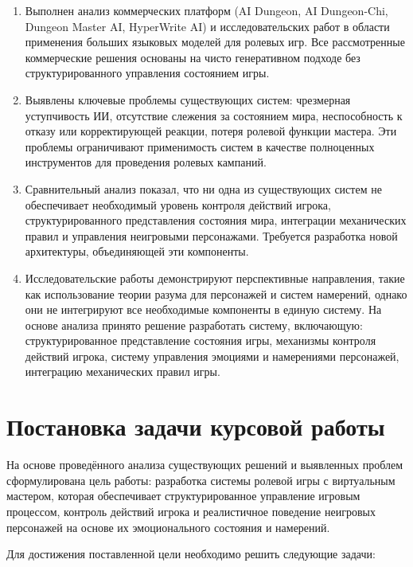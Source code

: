 \begin{enumerate}
	\item Выполнен анализ коммерческих платформ (AI Dungeon, AI Dungeon-Chi, Dungeon Master AI, HyperWrite AI) и исследовательских работ в области применения больших языковых моделей для ролевых игр. Все рассмотренные коммерческие решения основаны на чисто генеративном подходе без структурированного управления состоянием игры.
	
	\item Выявлены ключевые проблемы существующих систем: чрезмерная уступчивость ИИ, отсутствие слежения за состоянием мира, неспособность к отказу или корректирующей реакции, потеря ролевой функции мастера. Эти проблемы ограничивают применимость систем в качестве полноценных инструментов для проведения ролевых кампаний.
	
	\item Сравнительный анализ показал, что ни одна из существующих систем не обеспечивает необходимый уровень контроля действий игрока, структурированного представления состояния мира, интеграции механических правил и управления неигровыми персонажами. Требуется разработка новой архитектуры, объединяющей эти компоненты.
	
	\item Исследовательские работы демонстрируют перспективные направления, такие как использование теории разума для персонажей и систем намерений, однако они не интегрируют все необходимые компоненты в единую систему. На основе анализа принято решение разработать систему, включающую: структурированное представление состояния игры, механизмы контроля действий игрока, систему управления эмоциями и намерениями персонажей, интеграцию механических правил игры.
\end{enumerate}



\section{Постановка задачи курсовой работы}

На основе проведённого анализа существующих решений и выявленных проблем сформулирована цель работы: разработка системы ролевой игры с виртуальным мастером, которая обеспечивает структурированное управление игровым процессом, контроль действий игрока и реалистичное поведение неигровых персонажей на основе их эмоционального состояния и намерений.

Для достижения поставленной цели необходимо решить следующие задачи:

